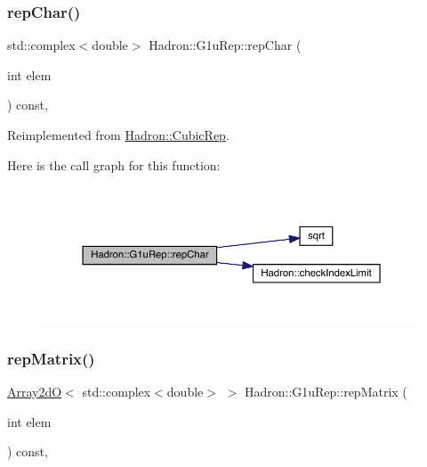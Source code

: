 \subsubsection{\texorpdfstring{repChar()}{repChar()}\hspace{0.1cm}{\footnotesize\ttfamily [2/2]}}
{\footnotesize\ttfamily std\+::complex$<$double$>$ Hadron\+::\+G1u\+Rep\+::rep\+Char (\begin{DoxyParamCaption}\item[{int}]{elem }\end{DoxyParamCaption}) const\hspace{0.3cm}{\ttfamily [inline]}, {\ttfamily [virtual]}}



Reimplemented from \mbox{\hyperlink{structHadron_1_1CubicRep_af45227106e8e715e84b0af69cd3b36f8}{Hadron\+::\+Cubic\+Rep}}.

Here is the call graph for this function\+:
\nopagebreak
\begin{figure}[H]
\begin{center}
\leavevmode
\includegraphics[width=350pt]{d8/d42/structHadron_1_1G1uRep_a3d37407f93af4c955c024aafa0948bcb_cgraph}
\end{center}
\end{figure}
\mbox{\label{structHadron_1_1G1uRep_a0f295ec0cd03014d647fa952f2c67676}} 
\subsubsection{\texorpdfstring{repMatrix()}{repMatrix()}\hspace{0.1cm}{\footnotesize\ttfamily [1/2]}}
{\footnotesize\ttfamily \mbox{\hyperlink{classADAT_1_1Array2dO}{Array2dO}}$<$ std\+::complex$<$double$>$ $>$ Hadron\+::\+G1u\+Rep\+::rep\+Matrix (\begin{DoxyParamCaption}\item[{int}]{elem }\end{DoxyParamCaption}) const\hspace{0.3cm}{\ttfamily [inline]}, {\ttfamily [virtual]}}




